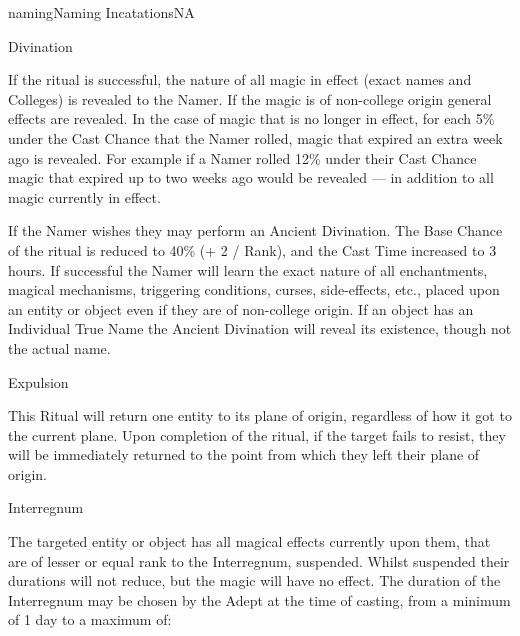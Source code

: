 \begin{College}[2.0]{naming}{Naming Incatations}{NA}
\begin{ritual}[R-1]{Divination}
\begin{effects}
If the ritual is successful, the nature of all magic in effect (exact
names and Colleges) is revealed to the Namer.  If the magic is of
non-college origin general effects are revealed.  In the case of magic
that is no longer in effect, for each 5\% under the Cast Chance that
the Namer rolled, magic that expired an extra week ago is revealed.
For example if a Namer rolled 12\% under their Cast Chance magic that
expired up to two weeks ago would be revealed — in addition to all
magic currently in effect.

If the Namer wishes they may perform an Ancient Divination.  The Base
Chance of the ritual is reduced to 40\% (+ 2 / Rank), and the Cast
Time increased to 3 hours.  If successful the Namer will learn the
exact nature of all enchantments, magical mechanisms, triggering
conditions, curses, side-effects, etc., placed upon an entity or
object even if they are of non-college origin.  If an object has an
Individual True Name the Ancient Divination will reveal its existence,
though not the actual name.
\end{effects}
\end{ritual}

\begin{ritual}[R-2]{Expulsion}

\begin{effects}
This Ritual will return one entity to its plane of origin, regardless
of how it got to the current plane. Upon completion of the ritual, if
the target fails to resist, they will be immediately returned to the
point from which they left their plane of origin.
\end{effects}
\end{ritual}

\begin{ritual}[R-3]{Interregnum}

\begin{effects}
The targeted entity or object has all magical effects currently upon
them, that are of lesser or equal rank to the Interregnum, suspended.
Whilst suspended their durations will not reduce, but the magic will
have no effect.  The duration of the Interregnum may be chosen by the
Adept at the time of casting, from a minimum of 1 day to a maximum of:



\end{effects}
\end{ritual}
\end{College}
